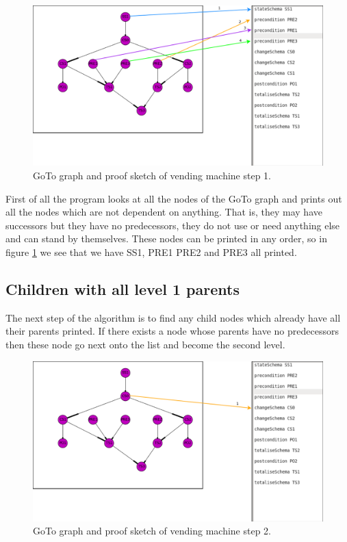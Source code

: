 \begin{figure}[H]
\includegraphics[scale=0.3]{Figures/skeleton/1.png}
\caption{GoTo graph and proof sketch of vending machine step 1.}
\label{fig:1}
\end{figure}

First of all the program looks at all the nodes of the GoTo graph and prints out
all the nodes which are not dependent on anything. That is, they may have
successors but they have no predecessors, they do not use or need anything else
and can stand by themselves. These nodes can be printed in any order, so in
figure \ref{fig:1} we see that we have SS1, PRE1 PRE2 and PRE3 all printed.

\subsection{Children with all level 1 parents}

The next step of the algorithm is to find any child nodes which already have all
their parents printed. If there exists a node whose parents have no predecessors then these
node go next onto the list and become the second level.

\begin{figure}[H]
\includegraphics[scale=0.3]{Figures/skeleton/2.png}
\caption{GoTo graph and proof sketch of vending machine step 2.}
\label{fig:2}
\end{figure}

